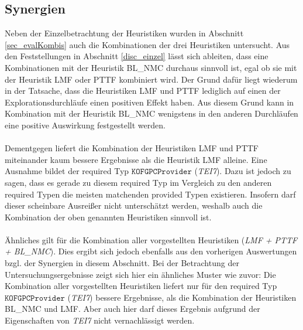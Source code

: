 \subsection{Synergien}\label{disc_synergien}
Neben der Einzelbetrachtung der Heuristiken wurden in Abschnitt \ref{sec_evalKombis} auch die Kombinationen der drei Heuristiken untersucht. Aus den Feststellungen in Abschnitt \ref{disc_einzel} lässt sich ableiten, dass eine Kombinationen mit der Heuristik BL\_NMC durchaus sinnvoll ist, egal ob sie mit der Heuristik LMF oder PTTF kombiniert wird. Der Grund dafür liegt wiederum in der Tatsache, dass die Heuristiken LMF und PTTF lediglich auf einen der Explorationsdurchläufe einen positiven Effekt haben. Aus diesem Grund kann in Kombination mit der Heuristik BL\_NMC wenigstens in den anderen Durchläufen eine positive Auswirkung festgestellt werden.
\\\\
Dementgegen liefert die Kombination der Heuristiken LMF und PTTF miteinander kaum bessere Ergebnisse als die Heuristik LMF alleine. Eine Ausnahme bildet der required Typ $\texttt{KOFGPCProvider}$ (\emph{TEI7}). Dazu ist jedoch zu sagen, dass es gerade zu diesem required Typ im Vergleich zu den anderen required Typen die meisten matchenden provided Typen existieren. Insofern darf dieser scheinbare Ausreißer nicht unterschätzt werden, weshalb auch die Kombination der oben genannten Heuristiken sinnvoll ist.
\\\\
Ähnliches gilt für die Kombination aller vorgestellten Heuristiken (\emph{LMF + PTTF + BL\_NMC}). Dies ergibt sich jedoch ebenfalls aus den vorherigen Auswertungen bzgl. der Synergien in diesem Abschnitt. Bei der Betrachtung der Untersuchungsergebnisse zeigt sich hier ein ähnliches Muster wie zuvor: Die Kombination aller vorgestellten Heuristiken liefert nur für den required Typ $\texttt{KOFGPCProvider}$ (\emph{TEI7}) bessere Ergebnisse, als die Kombination der Heuristiken BL\_NMC und LMF. Aber auch hier darf dieses Ergebnis aufgrund der Eigenschaften von \emph{TEI7} nicht vernachlässigt werden.

